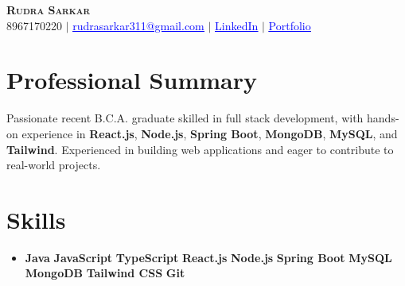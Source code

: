 \documentclass[letterpaper,11pt]{article}
\newcommand{\resumeSubHeadingListStart}{\begin{itemize}[leftmargin=0.10in, label={}]}
\begin{document}

\begin{center}
    \textbf{\Huge \scshape Rudra Sarkar} \\ \vspace{5pt}
    \small 8967170220 $|$ \href{mailto:rudrasarkar311@gmail.com}{\textcolor{blue}{\underline{rudrasarkar311@gmail.com}}} $|$
    \href{https://www.linkedin.com/in/rudra-sarkar-853385225}{\textcolor{blue}{\underline{LinkedIn}}} $|$
    \href{https://rudrasarkar5.github.io/my-portfolio/}{\textcolor{blue}{\underline{Portfolio}}} 
   

\end{center}


\section*{Professional Summary}
Passionate recent B.C.A. graduate skilled in full stack development, with hands-on experience in \textbf{React.js}, \textbf{Node.js}, \textbf{Spring Boot}, \textbf{MongoDB}, \textbf{MySQL}, and \textbf{Tailwind}. Experienced in building web applications and eager to contribute to real-world projects.


\section{Skills}
\begin{itemize}
    \item \textbf{Java} \textbullet{} \textbf{JavaScript} \textbullet{} \textbf{TypeScript} \textbullet{} \textbf{React.js} \textbullet{} \textbf{Node.js} \textbullet{} \textbf{Spring Boot} \textbullet{} \textbf{MySQL} \textbullet{} \textbf{MongoDB} \textbullet{} \textbf{Tailwind CSS} \textbullet{} \textbf{Git}
\end{itemize}



\end{document}
